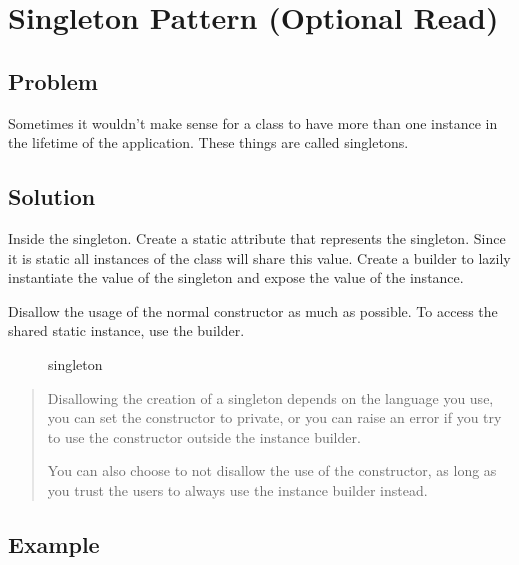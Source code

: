\section{Singleton Pattern (Optional
Read)}\label{creational-patterns.md__singleton-pattern-optional-read}

\subsection{Problem}\label{creational-patterns.md__problem-2}

Sometimes it wouldn't make sense for a class to have more than one
instance in the lifetime of the application. These things are called
singletons.

\subsection{Solution}\label{creational-patterns.md__solution-2}

Inside the singleton. Create a static attribute that represents the
singleton. Since it is static all instances of the class will share this
value. Create a builder to lazily instantiate the value of the singleton
and expose the value of the instance.

Disallow the usage of the normal constructor as much as possible. To
access the shared static instance, use the builder.

\begin{figure}
\centering
{}
\caption{singleton}
\end{figure}

\begin{quote}
Disallowing the creation of a singleton depends on the language you use,
you can set the constructor to private, or you can raise an error if you
try to use the constructor outside the instance builder.

You can also choose to not disallow the use of the constructor, as long
as you trust the users to always use the instance builder instead.
\end{quote}

\subsection{Example}\label{creational-patterns.md__example-2}

